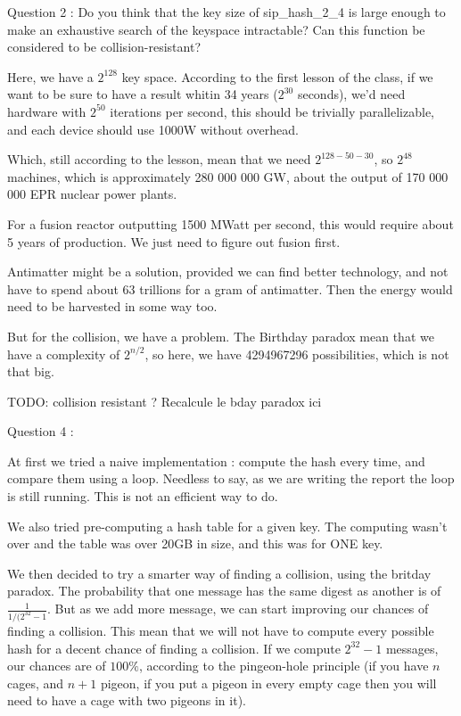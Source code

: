 \documentclass[4apaper]{report}
\begin{document}
Question 2 : Do you think that the key size of sip\_hash\_2\_4 is large enough to make an exhaustive search of the keyspace intractable? Can this function be considered to be collision-resistant?

Here, we have a $2^{128}$ key space. According to the first lesson of the class, if we want to be sure to have a result whitin 34 years ($2^{30}$ seconds), we'd need hardware with $2^{50}$ iterations per second, this should be trivially parallelizable, and each device should use 1000W without overhead.

Which, still according to the lesson, mean that we need $2^{128-50-30}$, so $2^{48}$ machines, which is approximately 280 000 000 GW, about the output of 170 000 000 EPR nuclear power plants.

For a fusion reactor outputting 1500 MWatt per second, this would require about 5 years of production. We just need to figure out fusion first.

Antimatter might be a solution, provided we can find better technology, and not have to spend about 63 trillions for a gram of antimatter. Then the energy would need to be harvested in some way too.

But for the collision, we have a problem. The Birthday paradox mean that we have a complexity of $2^{n/2}$, so here, we have 4294967296 possibilities, which is not that big.

TODO: collision resistant ? Recalcule le bday paradox ici

Question 4 : 

At first we tried a naive implementation : compute the hash every time, and compare them using a loop. Needless to say, as we are writing the report the loop is still running. This is not an efficient way to do.

We also tried pre-computing a hash table for a given key. The computing wasn't over and the table was over 20GB in size, and this was for ONE key.

We then decided to try a smarter way of finding a collision, using the britday paradox. The probability that one message has the same digest as another is of $\frac{1}{1/(2^{32} - 1}$. But as we add more message, we can start improving our chances of finding a collision. This mean that we will not have to compute every possible hash for a decent chance of finding a collision. If we compute $2^32-1$ messages, our chances are of $100\%$, according to the pingeon-hole principle (if you have $n$ cages, and $n+1$ pigeon, if you put a pigeon in every empty cage then you will need to have a cage with two pigeons in it).
\end{document}
